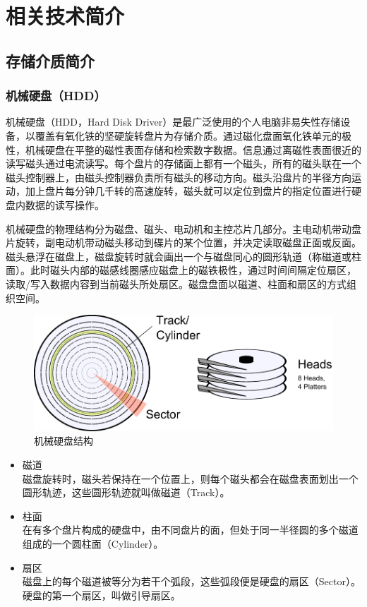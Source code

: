 
\chapter{相关技术简介}
\label{cha:related_work}

\section{存储介质简介}


\subsection{机械硬盘（HDD）}
机械硬盘（HDD，Hard Disk Driver）是最广泛使用的个人电脑非易失性存储设备，以覆盖有氧化铁的坚硬旋转盘片为存储介质。通过磁化盘面氧化铁单元的极性，机械硬盘在平整的磁性表面存储和检索数字数据。信息通过离磁性表面很近的读写磁头通过电流读写。每个盘片的存储面上都有一个磁头，所有的磁头联在一个磁头控制器上，由磁头控制器负责所有磁头的移动方向。磁头沿盘片的半径方向运动，加上盘片每分钟几千转的高速旋转，磁头就可以定位到盘片的指定位置进行硬盘内数据的读写操作。

机械硬盘的物理结构分为磁盘、磁头、电动机和主控芯片几部分。主电动机带动盘片旋转，副电动机带动磁头移动到碟片的某个位置，并决定读取磁盘正面或反面。磁头悬浮在磁盘上，磁盘旋转时就会画出一个与磁盘同心的圆形轨道（称磁道或柱面）。此时磁头内部的磁感线圈感应磁盘上的磁铁极性，通过时间间隔定位扇区，读取/写入数据内容到当前磁头所处扇区。磁盘盘面以磁道、柱面和扇区的方式组织空间。

\begin{figure}[H]
\centering
\includegraphics[width=0.6\linewidth]{./graph/hdd-struct}
\caption{机械硬盘结构}
\label{fig:hdd-struct}
\end{figure}

\begin{itemize}
\item 磁道
\\磁盘旋转时，磁头若保持在一个位置上，则每个磁头都会在磁盘表面划出一个圆形轨迹，这些圆形轨迹就叫做磁道（Track）。
\item 柱面
\\在有多个盘片构成的硬盘中，由不同盘片的面，但处于同一半径圆的多个磁道组成的一个圆柱面（Cylinder）。
\item 扇区
\\磁盘上的每个磁道被等分为若干个弧段，这些弧段便是硬盘的扇区（Sector）。硬盘的第一个扇区，叫做引导扇区。
\end{itemize}

